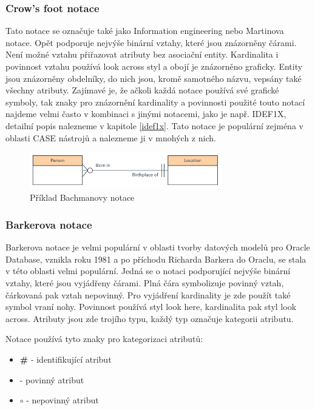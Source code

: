 \documentclass[czech,bachelor,public,dept460,male,oneside]{diploma}
\begin{document}
	\subsubsection{Crow's foot notace}
	Tato notace se označuje také jako Information engineering nebo Martinova notace. Opět podporuje nejvýše binární vztahy, které jsou znázorněny čárami. Není možné vztahu přiřazovat atributy bez asociační entity. Kardinalita i povinnost vztahu používá look across styl a obojí je znázorněno graficky. Entity jsou znázorněny obdelníky, do nich jsou, kromě samotného názvu, vepsány také všechny atributy. Zajímavé je, že ačkoli každá notace používá své grafické symboly, tak znaky pro znázornění kardinality a povinnosti použité touto notací najdeme velmi často v kombinaci s jinými notacemi, jako je např. IDEF1X, detailní popis nalezneme v kapitole \ref{idef1x}. Tato notace je populární zejména v oblasti CASE nástrojů a nalezneme ji v mnohých z nich.
	
	\begin{figure}[!h]
		\centering
		\includegraphics[width=0.75\textwidth]{Figures/NotationExCrow}
		\caption[Příklad Bachmanovy notace]{Příklad Bachmanovy notace \cite{whatIsERD}}
	\end{figure}
	
	\subsubsection{Barkerova notace}
	Barkerova notace je velmi populární v oblasti tvorby datových modelů pro Oracle Database, vznikla roku 1981 a po příchodu Richarda Barkera do Oraclu, se stala v této oblasti velmi populární. Jedná se o notaci podporující nejvýše binární vztahy, které jsou vyjádřeny čárami. Plná čára symbolizuje povinný vztah, čárkovaná pak vztah nepovinný. Pro vyjádření kardinality je zde použít také symbol vraní nohy. Povinnost používá styl look here, kardinalita pak styl look across. Atributy jsou zde trojího typu, každý typ označuje kategorii atributu. 
	
	Notace používá tyto znaky pro kategorizaci atributů:
	
	\begin{itemize}
		\item \textbf{\#} - identifikující atribut
		\item \textbf{\textasteriskcentered} - povinný atribut
		\item \textbf{$\circ$} - nepovinný atribut
	\end{itemize}
\end{document}
